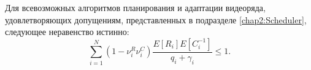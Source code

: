 \begin{lemma}
\label{lem:GeneralConstrain}
Для всевозможных алгоритмов планирования и адаптации видеоряда, удовлетворяющих допущениям, представленных в подразделе \ref{chap2:Scheduler}, следующее неравенство истинно:
\emph{
\begin{equation}
	\label{eq:GeneralConstrain}
	\sum\limits_{i=1}^{N} {\left(1-\nu^R_i\nu^C_i\right)\frac{E[R_i]E[C_i^{-1}]}{q_i + \gamma_i}} \leq 1.
\end{equation}
}
\end{lemma}

